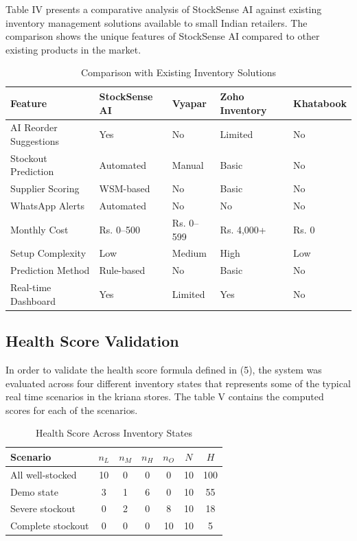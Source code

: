\documentclass[journal]{IEEEtran}
\begin{document}
Table IV presents a comparative analysis of StockSense AI 
against existing inventory management solutions available 
to small Indian retailers. The comparison shows the unique features 
of StockSense AI compared to other existing products in the market.

\begin{table}[htbp]
\centering
\caption{Comparison with Existing Inventory Solutions}
\label{tab:comparison}
\renewcommand{\arraystretch}{1.4}
\begin{tabularx}{\columnwidth}{lXXXX}
\toprule
\textbf{Feature} & \textbf{StockSense AI} & \textbf{Vyapar} & \textbf{Zoho Inventory} & \textbf{Khatabook} \\
\midrule
AI Reorder Suggestions & Yes & No & Limited & No \\
Stockout Prediction & Automated & Manual & Basic & No \\
Supplier Scoring & WSM-based & No & Basic & No \\
WhatsApp Alerts & Automated & No & No & No \\
Monthly Cost & Rs. 0--500 & Rs. 0--599 & Rs. 4,000+ & Rs. 0 \\
Setup Complexity & Low & Medium & High & Low \\
Prediction Method & Rule-based & No & Basic & No \\
Real-time Dashboard & Yes & Limited & Yes & No \\
\bottomrule
\end{tabularx}
\end{table}

\subsection*{Health Score Validation}
In order to validate the health score formula defined in (5), 
the system was evaluated across four different inventory states 
that represents some of the typical real time scenarios
in the kriana stores. 
The table V contains the computed scores for each of the scenarios.

\begin{table}[htbp]
\centering
\caption{Health Score Across Inventory States}
\label{tab:healthscores}
\renewcommand{\arraystretch}{1.4}
\begin{tabular}{lcccccc}
\toprule
\textbf{Scenario} & $n_L$ & $n_M$ & $n_H$ & $n_O$ & $N$ & $H$ \\
\midrule
All well-stocked   & 10 & 0 & 0 & 0 & 10 & 100 \\
Demo state         & 3  & 1 & 6 & 0 & 10 & 55  \\
Severe stockout    & 0  & 2 & 0 & 8 & 10 & 18  \\
Complete stockout  & 0  & 0 & 0 & 10 & 10 & 5   \\
\bottomrule
\end{tabular}
\end{table}
\end{document}
